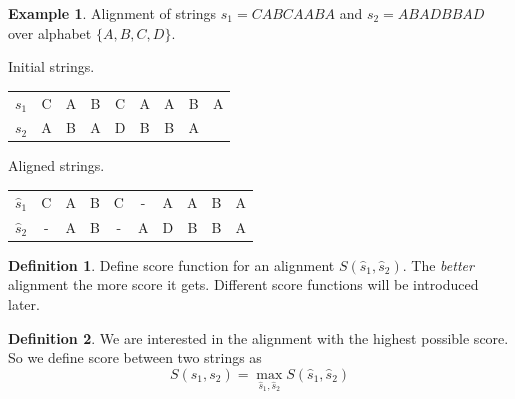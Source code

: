\documentclass[a4paper, 12pt]{article}
\theoremstyle{definition}
\newtheorem{definition}{Definition}[section]
\theoremstyle{definition}
\newtheorem{example}{Example}[section]
\newtheorem{theorem}{Theorem}
\theoremstyle{remark}
\begin{document}
\begin{example}
    Alignment of strings $s_1 = CABCAABA$ and $s_2 = ABADBBAD$ 
    over alphabet $\{ A, B, C, D\}$.

    \begin{center}
        Initial strings. \\
        \begin{tabular}{|| c | c c c c c c c c ||}
         $s_1$ & C & A & B & C & A & A & B & A \\ 
         $s_2$ & A & B & A & D & B & B & A &   \\    
        \end{tabular}

        \hfill \break 

        Aligned strings. \\
        \begin{tabular}{|| c | c c c c c c c c c ||}
            $\hat{s}_1$ & C & A & B & C & - & A & A & B & A \\ 
            $\hat{s}_2$ & - & A & B & - & A & D & B & B & A   
        \end{tabular}

    \end{center}
\end{example}



    

\begin{definition}
    Define score function for an alignment $S(\hat{s}_1, \hat{s}_2)$. 
    The \emph{better} alignment the more score it gets. 
    Different score functions will be introduced later.
\end{definition}

\begin{definition}
    We are interested in the alignment with the highest possible score. 
    So we define score between two strings as 
    $$ S(s_1, s_2) = \max_{\hat{s}_1, \hat{s}_2} S(\hat{s}_1, \hat{s}_2 )$$ 
\end{definition}
\end{document}
